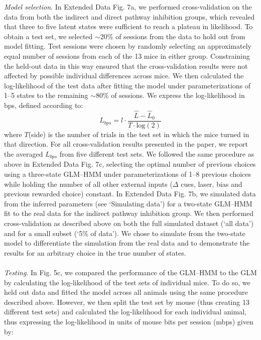 \textit{Model selection}.  In Extended Data Fig. 7a, we performed cross-validation on the data from both the indirect and direct pathway inhibition groups, which revealed that three to five latent states were sufficient to reach a plateau in likelihood. To obtain a test set, we selected $\sim$20\% of sessions from the data to hold out from model fitting. Test sessions were chosen by randomly selecting an approximately equal number of sessions from each of the 13 mice in either group. Constraining the held-out data in this way ensured that the cross-validation results were not affected by possible individual differences across mice. We then calculated the log-likelihood of the test data after fitting the model under parameterizations of 1–5 states to the remaining $\sim$80\% of sessions. We express the log-likelihood in bps, defined according to: 
\begin{equation}
\label{eq:m16}
L_{bps} = l \cdot \frac{{\hat L - \hat L_0}}{{T \cdot {{{\mathrm{log}}}}(2)}}
\end{equation}
where $T$(side) is the number of trials in the test set in which the mice turned in that direction. For all cross-validation results presented in the paper, we report the averaged $L_{bps}$ from five different test sets. We followed the same procedure as above in Extended Data Fig. 7c, selecting the optimal number of previous choices using a three-state GLM–HMM under parameterizations of 1–8 previous choices while holding the number of all other external inputs ($\Delta$ cues, laser, bias and previous rewarded choice) constant. In Extended Data Fig. 7b, we simulated data from the inferred parameters (see `Simulating data’) for a two-state GLM–HMM fit to the real data for the indirect pathway inhibition group. We then performed cross-validation as described above on both the full simulated dataset (‘all data’) and for a small subset (`5\% of data’). We chose to simulate from the two-state model to differentiate the simulation from the real data and to demonstrate the results for an arbitrary choice in the true number of states. \\\\
\textit{Testing}. In Fig. 5c, we compared the performance of the GLM–HMM to the GLM by calculating the log-likelihood of the test sets of individual mice. To do so, we held out data and fitted the model across all animals using the same procedure described above. However, we then split the test set by mouse (thus creating 13 different test sets) and calculated the log-likelihood for each individual animal, thus expressing the log-likelihood in units of mouse bits per session (mbps) given by:
